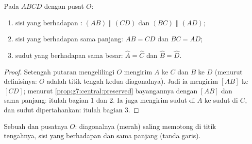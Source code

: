 \begin{theorem}\label{thm:g7:central:properties}
Pada  $ABCD$ dengan pusat $O$:
\begin{enumerate}
  \item sisi yang berhadapan : $(AB) \parallel (CD)$ dan
        $(BC) \parallel (AD)$;
  \item sisi yang berhadapan sama panjang: $AB = CD$ dan
        $BC = AD$;
  \item sudut yang berhadapan sama besar: $\widehat A = \widehat C$ dan
        $\widehat B = \widehat D$.
\end{enumerate}
\end{theorem}

\begin{proof}
Setengah putaran mengelilingi $O$ mengirim $A$ ke $C$ dan $B$ ke $D$
(menurut definisinya: $O$ adalah titik tengah kedua diagonalnya). Jadi
ia mengirim  $[AB]$ ke  $[CD]$; menurut
\cref{prop:g7:central:preserved} bayangannya  dengan $[AB]$ dan
sama panjang: itulah bagian 1 dan 2. Ia juga mengirim sudut di $A$ ke
sudut di $C$, dan sudut dipertahankan: itulah bagian 3.
\end{proof}

\begin{omfigure}

{\small Sebuah  dan pusatnya $O$: diagonalnya (merah)
saling memotong di titik tengahnya, sisi yang berhadapan  dan
sama panjang (tanda garis).}
\end{omfigure}

